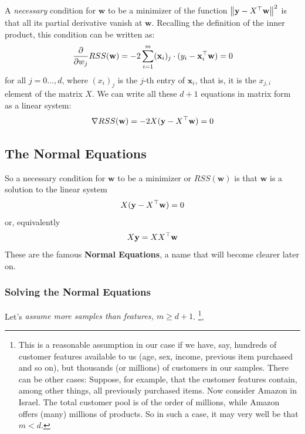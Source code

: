 A \textit{necessary} condition for $\mathbf{w}$ to be a minimizer of the function $ \left\| \mathbf{y}-X^{\top}\mathbf{w}\right\|^2$ is that all its partial derivative vanish at $\mathbf{w}$. Recalling the definition of the inner product, this condition can be written as:
    \[
    \frac{\partial}{\partial w_j} RSS(\mathbf{w}) =
    -2\sum_{i=1}^m (\mathbf{x}_i)_j \cdot (y_i-\mathbf{x}_i^{\top} \mathbf{w})=0
    \]
for all $j=0\ldots,d$, where $(x_i)_j$ is the $j$-th entry of  $\mathbf{x}_i$, that is, it is the $x_{j,i}$ element of the matrix $X$.
 We can write all these $d+1$ equations in matrix form as a linear system:
    \[
    \nabla RSS(\mathbf{w}) = -2X(\mathbf{y}-X^{\top} \mathbf{w})=0
    \]


\subsection{The Normal Equations}

So a necessary condition for $\mathbf{w}$ to be a minimizer or $RSS(\mathbf{w})$ is that $\mathbf{w}$ is a solution to the linear system
\[
 X(\mathbf{y}-X^{\top} \mathbf{w})=0
\]
or, equivalently
\[
X \mathbf{y}= XX^{\top} \mathbf{w}
\]
These are the famous \textbf{Normal Equations}, a name that will become clearer later on.


\subsubsection{Solving the Normal Equations}
Let's \textit{assume more samples than features, $m\geq d+1$}. \footnote{This is a reasonable assumption in our case if we have, say, hundreds of customer features available to us (age, sex, income, previous item purchased and so on), but thousands (or millions) of customers in our samples. There can be other cases: Suppose, for example, that the customer features contain, among other things, all previously purchased items. Now consider Amazon in Israel. The total customer pool is of the order of millions, while Amazon offers (many) millions of products. So in such a case, it may very well be that $m<d$.},





